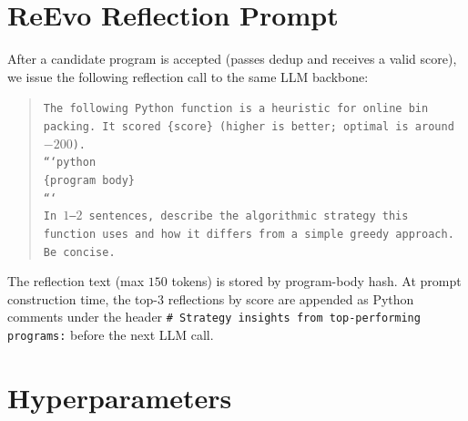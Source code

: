 \documentclass{article}
\begin{document}
\section{ReEvo Reflection Prompt}
\label{app:reevo}

After a candidate program is accepted (passes dedup and receives a valid score), we
issue the following reflection call to the same LLM backbone:

\begin{quote}\small
\texttt{The following Python function is a heuristic for online bin packing. It scored
\{score\} (higher is better; optimal is around $-200$).}\\[0.5ex]
\texttt{```python\\
\{program body\}\\
```}\\[0.5ex]
\texttt{In $1$--$2$ sentences, describe the algorithmic strategy this function uses and
how it differs from a simple greedy approach. Be concise.}
\end{quote}

The reflection text (max $150$ tokens) is stored by program-body hash. At prompt
construction time, the top-$3$ reflections by score are appended as
Python comments under the header \texttt{\# Strategy insights from top-performing
programs:} before the next LLM call.

\section{Hyperparameters}
\label{app:hparams}
\end{document}
